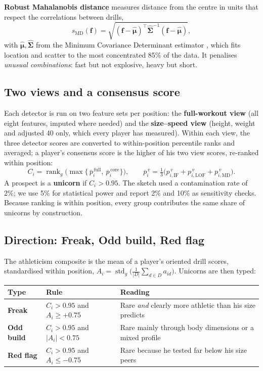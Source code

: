\documentclass[11pt]{article}
\begin{document}
\textbf{Robust Mahalanobis distance} measures distance from the centre in units that respect the correlations between drills,
\begin{equation}
s_{\mathrm{MD}}(\mathbf{f}) = \sqrt{(\mathbf{f}-\hat{\boldsymbol\mu})^{\!\top}\hat{\boldsymbol\Sigma}^{-1}(\mathbf{f}-\hat{\boldsymbol\mu})},
\end{equation}
with $\hat{\boldsymbol\mu},\hat{\boldsymbol\Sigma}$ from the Minimum Covariance Determinant estimator \cite{mcd}, which fits location and scatter to the most concentrated 85\% of the data. It penalises \emph{unusual combinations}: fast but not explosive, heavy but short.

\subsection{Two views and a consensus score}

Each detector is run on two feature sets per position: the \textbf{full-workout view} (all eight features, imputed where needed) and the \textbf{size--speed view} (height, weight and adjusted 40 only, which every player has measured). Within each view, the three detector scores are converted to within-position percentile ranks and averaged; a player's consensus score is the higher of his two view scores, re-ranked within position:
\begin{equation}
C_i=\operatorname{rank}_g\!\Big(\max\big\{\,\overline{p}^{\,\mathrm{full}}_i,\ \overline{p}^{\,\mathrm{core}}_i\big\}\Big),\qquad \overline{p}^{\,v}_i=\tfrac13\big(p^{\,v}_{i,\mathrm{IF}}+p^{\,v}_{i,\mathrm{LOF}}+p^{\,v}_{i,\mathrm{MD}}\big).
\end{equation}
A prospect is a \textbf{unicorn} if $C_i>0.95$. The sketch used a contamination rate of 2\%; we use 5\% for statistical power and report 2\% and 10\% as sensitivity checks. Because ranking is within position, every group contributes the same share of unicorns by construction.

\subsection{Direction: Freak, Odd build, Red flag}

The athleticism composite is the mean of a player's oriented drill scores, standardised within position, $A_i = \operatorname{std}_g\!\big(\tfrac1{|D|}\sum_{d\in D} a_{id}\big)$. Unicorns are then typed:
\begin{center}\small\sffamily
\begin{tabular}{lll}
\toprule
Type & Rule & Reading\\
\midrule
\textcolor{freakc}{\textbf{Freak}} & $C_i>0.95$ and $A_i\ge +0.75$ & Rare \emph{and} clearly more athletic than his size predicts\\
\textbf{Odd build} & $C_i>0.95$ and $|A_i|<0.75$ & Rare mainly through body dimensions or a mixed profile\\
\textcolor{bustc}{\textbf{Red flag}} & $C_i>0.95$ and $A_i\le -0.75$ & Rare because he tested far below his size peers\\
\bottomrule
\end{tabular}
\end{center}
\end{document}
